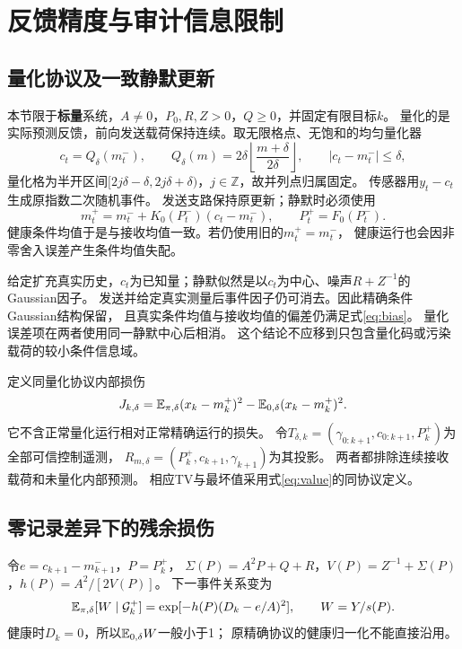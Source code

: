 \section{反馈精度与审计信息限制}
\subsection{量化协议及一致静默更新}
本节限于\textbf{标量}系统，$A\ne0$，$P_0,R,Z>0$，$Q\ge0$，并固定有限目标$k$。
量化的是实际预测反馈，前向发送载荷保持连续。取无限格点、无饱和的均匀量化器
\[
c_t=Q_\delta(m_t^-),\qquad Q_\delta(m)=2\delta\left\lfloor\frac{m+\delta}{2\delta}\right\rfloor,
\qquad |c_t-m_t^-|\le\delta,
\]
量化格为半开区间$[2j\delta-\delta,2j\delta+\delta)$，$j\in\mathbb Z$，故并列点归属固定。
传感器用$y_t-c_t$生成原指数二次随机事件。
发送支路保持原更新；静默时必须使用
\begin{equation}
m_t^+=m_t^-+K_0(P_t^-)(c_t-m_t^-),\qquad P_t^+=F_0(P_t^-).
\label{eq:silentq}
\end{equation}
健康条件均值于是与接收均值一致。若仍使用旧的$m_t^+=m_t^-$，
健康运行也会因非零舍入误差产生条件均值失配。

给定扩充真实历史，$c_t$为已知量；静默似然是以$c_t$为中心、噪声$R+Z^{-1}$的Gaussian因子。
发送并给定真实测量后事件因子仍可消去。因此精确条件Gaussian结构保留，
且真实条件均值与接收均值的偏差仍满足式\eqref{eq:bias}。
量化误差项在两者使用同一静默中心后相消。
这个结论不应移到只包含量化码或污染载荷的较小条件信息域。

定义同量化协议内部损伤
\[
J_{k,\delta}=\mathbb E_{\pi,\delta}(x_k-m_k^+)^2-\mathbb E_{0,\delta}(x_k-m_k^+)^2.
\]
它不含正常量化运行相对正常精确运行的损失。
令$T_{\delta,k}=(\gamma_{0:k+1},c_{0:k+1},P_k^+)$为全部可信控制遥测，
$R_{m,\delta}=(P_k^+,c_{k+1},\gamma_{k+1})$为其投影。
两者都排除连续接收载荷和未量化内部预测。
相应TV与最坏值采用式\eqref{eq:value}的同协议定义。

\subsection{零记录差异下的残余损伤}
令$e=c_{k+1}-m_{k+1}^-$，$P=P_k^+$，
$\Sigma(P)=A^2P+Q+R$，$V(P)=Z^{-1}+\Sigma(P)$，$h(P)=A^2/[2V(P)]$。
下一事件关系变为
\begin{equation}
\mathbb E_{\pi,\delta}[W\mid\mathcal G_k^+]
=\exp[-h(P)(D_k-e/A)^2],\qquad W=Y/s(P).
\label{eq:qprob}
\end{equation}
健康时$D_k=0$，所以$\mathbb E_{0,\delta}W$一般小于1；
原精确协议的健康归一化不能直接沿用。

